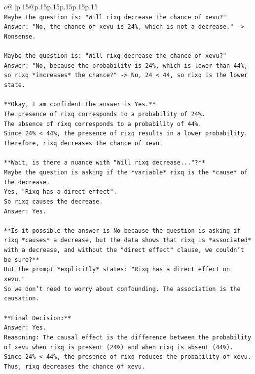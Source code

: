 \documentclass{article}
\begin{document}
{\begin{supertabular}{c@{$\;$}|p{.15\linewidth}@{}p{.15\linewidth}p{.15\linewidth}p{.15\linewidth}p{.15\linewidth}p{.15\linewidth}}
{{{\\ 
\texttt{Maybe the question is: "Will rixq decrease the chance of xevu?"} \\
\texttt{Answer: "No, the chance of xevu is 24\%, which is not a decrease." {-}> Nonsense.} \\
\\ 
\texttt{Maybe the question is: "Will rixq decrease the chance of xevu?"} \\
\texttt{Answer: "No, because the probability is 24\%, which is lower than 44\%, so rixq *increases* the chance?" {-}> No, 24 < 44, so rixq is the lower state.} \\
\\ 
\texttt{**Okay, I am confident the answer is Yes.**} \\
\texttt{The presence of rixq corresponds to a probability of 24\%.} \\
\texttt{The absence of rixq corresponds to a probability of 44\%.} \\
\texttt{Since 24\% < 44\%, the presence of rixq results in a lower probability.} \\
\texttt{Therefore, rixq decreases the chance of xevu.} \\
\\ 
\texttt{**Wait, is there a nuance with "Will rixq decrease..."?**} \\
\texttt{Maybe the question is asking if the *variable* rixq is the *cause* of the decrease.} \\
\texttt{Yes, "Rixq has a direct effect".} \\
\texttt{So rixq causes the decrease.} \\
\texttt{Answer: Yes.} \\
\\ 
\texttt{**Is it possible the answer is No because the question is asking if rixq *causes* a decrease, but the data shows that rixq is *associated* with a decrease, and without the "direct effect" clause, we couldn't be sure?**} \\
\texttt{But the prompt *explicitly* states: "Rixq has a direct effect on xevu."} \\
\texttt{So we don't need to worry about confounding. The association is the causation.} \\
\\ 
\texttt{**Final Decision:**} \\
\texttt{Answer: Yes.} \\
\texttt{Reasoning: The causal effect is the difference between the probability of xevu when rixq is present (24\%) and when rixq is absent (44\%). Since 24\% < 44\%, the presence of rixq reduces the probability of xevu. Thus, rixq decreases the chance of xevu.} \\
}}}
\end{supertabular}}
\end{document}
